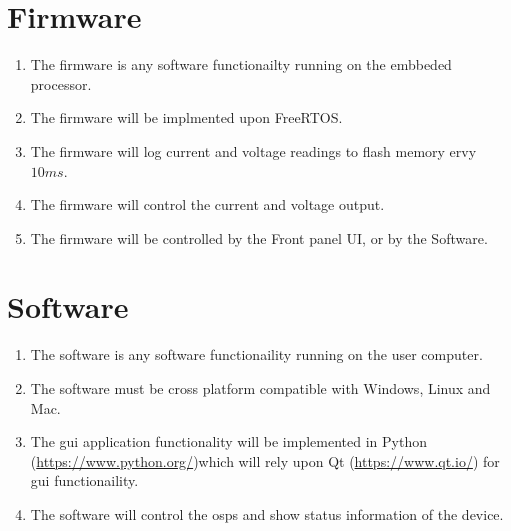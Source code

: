 \documentclass[12pt,a4paper]{article}
\begin{document}
\section{Firmware}
\begin{enumerate}[label*=\arabic*.]
\item The firmware is any software functionailty running on the embbeded processor.
\item The firmware will be implmented upon FreeRTOS.
\item The firmware will log current and voltage readings to flash memory ervy $10ms$.
\item The firmware will control the current and voltage output.
\item The firmware will be controlled by the Front panel UI, or by the Software.
\end{enumerate}


\section{Software}
\begin{enumerate}[label*=\arabic*.]
\item The software is any software functionaility running on the user computer.
\item The software must be cross platform compatible with Windows, Linux and Mac.
\item The \gls{gui} application functionality will be implemented in Python (\url{https://www.python.org/})which will rely upon Qt (\url{https://www.qt.io/}) for \gls{gui} functionaility.
\item The software will control the \gls{osps} and show status information of the device. 
\end{enumerate}
\end{document}
